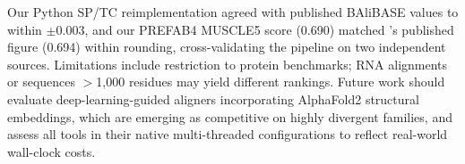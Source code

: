\documentclass[unnumsec,webpdf,contemporary,large]{oup-authoring-template}
\begin{document}
Our Python SP/TC reimplementation agreed with published BAliBASE values
to within $\pm 0.003$, and our PREFAB4 MUSCLE5 score (0.690) matched
\citet{edgar2022muscle5}'s published figure (0.694) within rounding,
cross-validating the pipeline on two independent sources.
Limitations include restriction to protein benchmarks; RNA alignments or
sequences $>$1,000 residues may yield different rankings.
Future work should evaluate deep-learning-guided aligners incorporating
AlphaFold2 structural embeddings, which are emerging as competitive on
highly divergent families, and assess all tools in their native
multi-threaded configurations to reflect real-world wall-clock costs.



\end{document}
